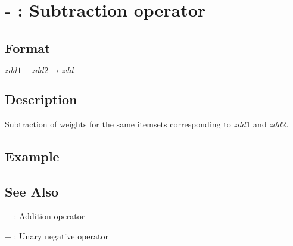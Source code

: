 
\section{- : Subtraction operator\label{sect:minus}}
\subsection*{Format}
$zdd1 - zdd2 \rightarrow zdd$

\subsection*{Description}
Subtraction of weights for the same itemsets corresponding to $zdd1$ and $zdd2$.

\subsection*{Example}


\subsection*{See Also}
\hyperref[sect:plus]{$+$} : Addition operator 

\hyperref[sect:minus_op]{$-$} : Unary negative operator

